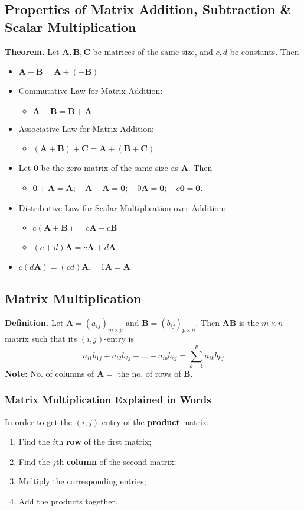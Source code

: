 \documentclass[../ma2001_notes.tex]{subfiles}
\begin{document}
\subsection{Properties of Matrix Addition, Subtraction \& Scalar Multiplication}
\textbf{Theorem.} Let \(\bm{A},\bm{B},\bm{C}\) be matrices of the same size, and \(c,d\) be constants. Then
\begin{itemize}
	\item\(\bm{A}-\bm{B}=\bm{A}+(-\bm{B})\)
	\item Commutative Law for Matrix Addition:
	\begin{itemize}
		\item\(\bm{A}+\bm{B}=\bm{B}+\bm{A}\)
	\end{itemize}
	\item Associative Law for Matrix Addition:
	\begin{itemize}
		\item\((\bm{A}+\bm{B})+\bm{C}=\bm{A}+(\bm{B}+\bm{C})\)
	\end{itemize}
	\item Let \(\bm{0}\) be the zero matrix of the same size as \(\bm{A}\). Then
	\begin{itemize}
		\item\(\bm{0}+\bm{A}=\bm{A};\quad\bm{A}-\bm{A}=\bm{0};\quad0\bm{A}=\bm{0};\quad c\bm{0}=\bm{0}\).
	\end{itemize}
	\item Distributive Law for Scalar Multiplication over Addition:
	\begin{itemize}
		\item\(c(\bm{A}+\bm{B})=c\bm{A}+c\bm{B}\)
		\item\((c+d)\bm{A}=c\bm{A}+d\bm{A}\)
	\end{itemize}
	\item\(c(d\bm{A})=(cd)\bm{A},\quad1\bm{A}=\bm{A}\)
\end{itemize}

\subsection{Matrix Multiplication}
\textbf{Definition.} Let \(\bm{A}=(a_{ij})_{m\times p}\) and \(\bm{B}=(b_{ij})_{p\times n}\). Then \(\bm{AB}\) is the \(m\times n\) matrix such that its \((i,j)\)-entry is
\[a_{i1}b_{1j}+a_{i2}b_{2j}+\ldots+a_{ip}b_{pj}=\sum_{k=1}^pa_{ik}b_{kj}\]
\textbf{Note:} No. of columns of \(\bm{A}=\) the no. of rows of \(\bm{B}\).

\subsubsection{Matrix Multiplication Explained in Words}
In order to get the \((i,j)\)-entry of the \textbf{product} matrix:
\begin{enumerate}
	\item Find the \(i\)th \textbf{row} of the first matrix;
	\item Find the \(j\)th \textbf{column} of the second matrix;
	\item Multiply the corresponding entries;
	\item Add the products together.
\end{enumerate}
\end{document}
